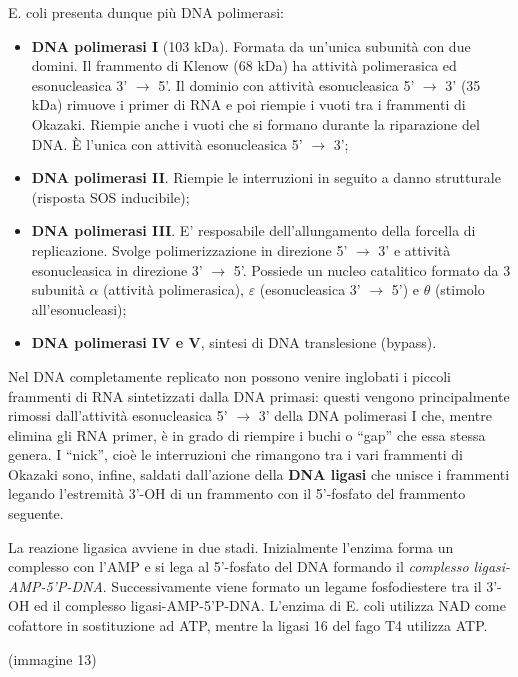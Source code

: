 \documentclass[]{article}
\begin{document}
E. coli presenta dunque più DNA polimerasi:

\begin{itemize}
\itemsep1pt\parskip0pt
\item
  \textbf{DNA polimerasi I} (103 kDa). Formata da un'unica subunità con
  due domini. Il frammento di Klenow (68 kDa) ha attività polimerasica
  ed esonucleasica 3' \(\rightarrow\) 5'. Il dominio con attività
  esonucleasica 5' \(\rightarrow\) 3' (35 kDa) rimuove i primer di RNA e
  poi riempie i vuoti tra i frammenti di Okazaki. Riempie anche i vuoti
  che si formano durante la riparazione del DNA. È l'unica con attività
  esonucleasica 5' \(\rightarrow\) 3';
\item
  \textbf{DNA polimerasi II}. Riempie le interruzioni in seguito a danno
  strutturale (risposta SOS inducibile);
\item
  \textbf{DNA polimerasi III}. E' resposabile dell'allungamento della
  forcella di replicazione. Svolge polimerizzazione in direzione 5'
  \(\rightarrow\) 3' e attività esonucleasica in direzione 3'
  \(\rightarrow\) 5'. Possiede un nucleo catalitico formato da 3
  subunità \(\alpha\) (attività polimerasica), \(\varepsilon\)
  (esonucleasica 3' \(\rightarrow\) 5') e \(\theta\) (stimolo
  all'esonucleasi);
\item
  \textbf{DNA polimerasi IV e V}, sintesi di DNA translesione (bypass).
\end{itemize}

Nel DNA completamente replicato non possono venire inglobati i piccoli
frammenti di RNA sintetizzati dalla DNA primasi: questi vengono
principalmente rimossi dall'attività esonucleasica 5' \(\rightarrow\) 3'
della DNA polimerasi I che, mentre elimina gli RNA primer, è in grado di
riempire i buchi o ``gap'' che essa stessa genera. I ``nick'', cioè le
interruzioni che rimangono tra i vari frammenti di Okazaki sono, infine,
saldati dall'azione della \textbf{DNA ligasi} che unisce i frammenti
legando l'estremità 3'-OH di un frammento con il 5'-fosfato del
frammento seguente.

La reazione ligasica avviene in due stadi. Inizialmente l'enzima forma
un complesso con l'AMP e si lega al 5'-fosfato del DNA formando il
\emph{complesso ligasi-AMP-5'P-DNA}. Successivamente viene formato un
legame fosfodiestere tra il 3'-OH ed il complesso ligasi-AMP-5'P-DNA.
L'enzima di E. coli utilizza NAD come cofattore in sostituzione ad ATP,
mentre la ligasi 16 del fago T4 utilizza ATP.

(immagine 13)
\end{document}
